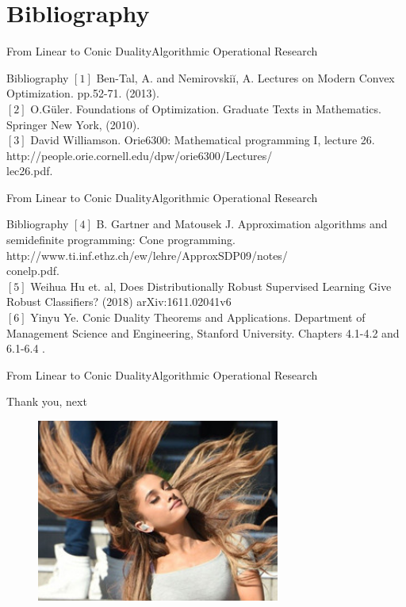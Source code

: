 \documentclass[11pt,aspectratio=169]{beamer}
\newcommand{\TT}{From Linear to Conic Duality}
\newcommand{\TL}{Algorithmic Operational Research}
\newcommand{\BI}{Bibliography}
\begin{document}
\section{\BI}
\begin{frame}{\TT}{\TL}
 \begin{block}{\BI}\pause
\Large
$[1]$ Ben-Tal, A. and Nemirovskiĭ, A. Lectures on Modern Convex Optimization. pp.52-71. (2013). \\
$[2]$ O.Güler. Foundations of Optimization. Graduate Texts in Mathematics. Springer New York, (2010). \\
$[3]$ David Williamson. Orie6300: Mathematical programming I, lecture 26. http://people.orie.cornell.edu/dpw/orie6300/Lectures/\\
lec26.pdf. \\

 \end{block}
\end{frame}

\begin{frame}{\TT}{\TL}
 \begin{block}{\BI}
\Large
$[4]$ B. Gartner and Matousek J. Approximation algorithms and semidefinite programming: Cone programming. http://www.ti.inf.ethz.ch/ew/lehre/ApproxSDP09/notes/\\conelp.pdf. \\
$[5]$ Weihua Hu et. al, Does Distributionally Robust Supervised Learning Give Robust Classifiers? (2018) arXiv:1611.02041v6 \\
$[6]$ Yinyu Ye. Conic Duality Theorems and Applications. Department of Management Science and Engineering, Stanford University. Chapters 4.1-4.2 and 6.1-6.4 . 
 \end{block}
\end{frame}

\begin{frame}{\TT}{\TL}
 \begin{block}{Thank you, next}
\Large
\begin{figure}
\begin{center}
  \includegraphics[width = 8cm]{grand.jpg}
 \end{center}
\end{figure}
 \end{block}
\end{frame}
\end{document}
